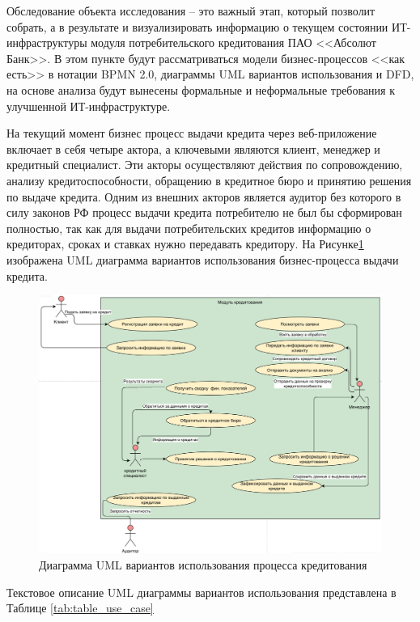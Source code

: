 \documentclass[14pt, a4paper]{extarticle}
\begin{document}
Обследование объекта исследования -- это важный этап, который позволит
собрать, а в результате и визуализировать информацию о текущем состоянии
ИТ-инфраструктуры модуля потребительского кредитования ПАО <<Абсолют Банк>>. В
этом пункте будут рассматриваться модели бизнес-процессов <<как есть>> в
нотации BPMN 2.0, диаграммы UML вариантов использования и DFD, на основе
анализа будут вынесены формальные и неформальные требования к улучшенной
ИТ-инфраструктуре.

На текущий момент бизнес процесс выдачи кредита через веб-приложение включает в
себя четыре актора, а ключевыми являются клиент, менеджер и кредитный
специалист. Эти акторы осуществляют действия по сопровождению, анализу
кредитоспособности, обращению в кредитное бюро и принятию решения по выдаче
кредита. Одним из внешних акторов является аудитор без которого в силу законов
РФ процесс выдачи кредита потребителю не был бы сформирован полностью, так как
для выдачи потребительских кредитов информацию о кредиторах, сроках и ставках
нужно передавать кредитору. На Рисунке\;\ref{fig:uml_use_case} изображена UML
диаграмма вариантов использования бизнес-процесса выдачи кредита.

\begin{figure}[H]
	\centering
	\includegraphics[width=\textwidth]{uml_use_case_extended}
	\caption{Диаграмма UML вариантов использования процесса кредитования}
	\label{fig:uml_use_case}
\end{figure}

Текстовое описание UML диаграммы вариантов использования представлена в Таблице
\ref{tab:table_use_case}
\end{document}

